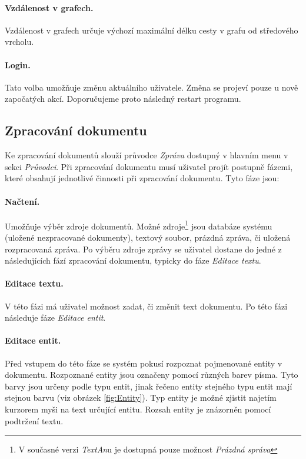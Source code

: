 \documentclass[12pt,a4paper]{report}
\newcommand{\textan}{\emph{TextAn}}
\begin{document}
\paragraph{Vzdálenost v grafech.}
Vzdálenost v grafech určuje výchozí maximální délku cesty v grafu od středového vrcholu. 

\paragraph{Login.}
Tato volba umožňuje změnu aktuálního uživatele. Změna se projeví pouze u nově započatých akcí. Doporučujeme proto následný restart programu.

\subsection{Zpracování dokumentu}
Ke zpracování dokumentů slouží průvodce \emph{Zpráva} dostupný v hlavním menu v sekci \emph{Průvodci}. Při zpracování dokumentu musí uživatel projít postupně fázemi, které obsahují jednotlivé činnosti při zpracování dokumentu. Tyto fáze jsou:

\paragraph{Načtení.}
Umožňuje výběr zdroje dokumentů. Možné zdroje\footnote{V současné verzi \textan u je dostupná pouze možnost \emph{Prázdná správa}} jsou databáze systému (uložené nezpracované dokumenty), textový soubor, prázdná zpráva, či uložená rozpracovaná zpráva. Po výběru zdroje zprávy se uživatel dostane do jedné z následujících fází zpracování dokumentu, typicky do fáze \emph{Editace textu}.

\paragraph{Editace textu.}
V této fázi má uživatel možnost zadat, či změnit text dokumentu. Po této fázi následuje fáze \emph{Editace entit}.

\paragraph{Editace entit.}
Před vstupem do této fáze se systém pokusí rozpoznat pojmenované entity v dokumentu. Rozpoznané entity jsou označeny pomocí různých barev písma. Tyto barvy jsou určeny podle typu entit, jinak řečeno entity stejného typu entit mají stejnou barvu (viz obrázek \ref{fig:Entity}). Typ entity je možné zjistit najetím kurzorem myši na text určující entitu. Rozsah entity je znázorněn pomocí podtržení textu.
\end{document}

